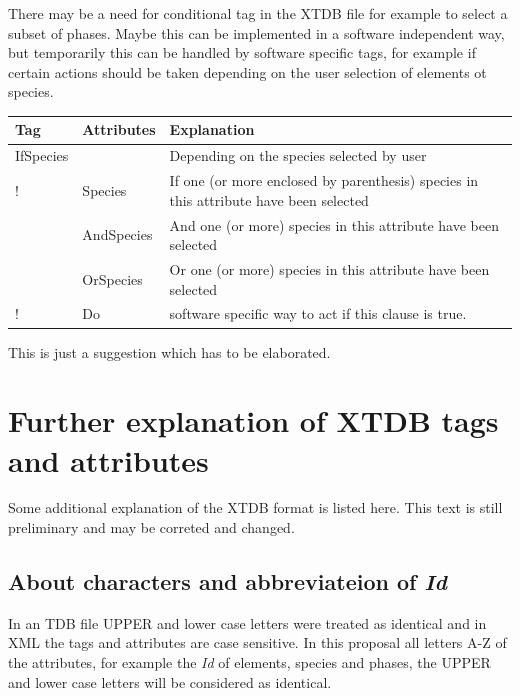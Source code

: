 \documentclass{article}
\begin{document}
There may be a need for conditional tag in the XTDB file for example
to select a subset of phases.  Maybe this can be implemented in a
software independent way, but temporarily this can be handled by
software specific tags, for example if certain actions should be taken
depending on the user selection of elements ot species.

\bigskip
\begin{tabular}{|p{} p{} p{}|}\hline
  Tag & Attributes &  Explanation\\\hline

  IfSpecies & & Depending on the species selected by user\\
!      & Species & If one (or more enclosed by parenthesis) species
                  in this attribute have been selected\\
      & AndSpecies & And one (or more) species in this attribute have
                     been selected\\
      & OrSpecies & Or one (or more) species in this attribute have
                     been selected\\
!      & Do & software specific way to act if this clause is true.\\\hline
  
\end{tabular}

This is just a suggestion which has to be elaborated.

\newpage

\section{Further explanation of XTDB tags and attributes}\label{sec:attributes}

Some additional explanation of the XTDB format is listed here.  This
text is still preliminary and may be correted and changed.

\subsection{About characters and abbreviateion of {\em Id}}\label{sec:lettercase}

In an TDB file UPPER and lower case letters were treated as identical
and in XML the tags and attributes are case sensitive.  In this
proposal all letters A-Z of the attributes, for example the {\em Id} of
elements, species and phases, the UPPER and lower case letters will be
considered as identical.
\end{document}
